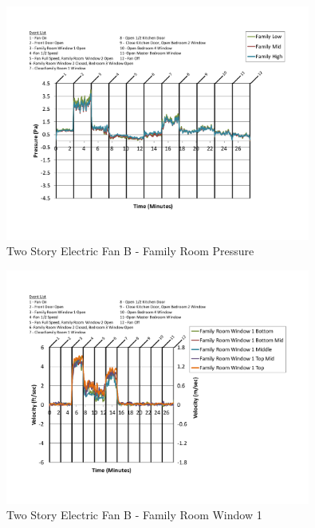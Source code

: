 \documentclass{article}
\begin{document}
\begin{appendices}
	\begin{figure}[H]
		\centering
		\includegraphics[height=3.05in,trim=0.67in 1.1in 0.67in 0.8in,clip=true]{0_Images/Results_Charts/ColdFlow/Two_Story/Electric/B/Family_Room_Pressure.pdf}
		\caption{Two Story Electric Fan B - Family Room Pressure}
	\end{figure}
 

	\begin{figure}[H]
		\centering
		\includegraphics[height=3.05in,trim=0.67in 1.1in 0.67in 0.8in,clip=true]{0_Images/Results_Charts/ColdFlow/Two_Story/Electric/B/Family_Room_Window_1.pdf}
		\caption{Two Story Electric Fan B - Family Room Window 1}
	\end{figure}
 
	\clearpage


\end{appendices}
\end{document}
